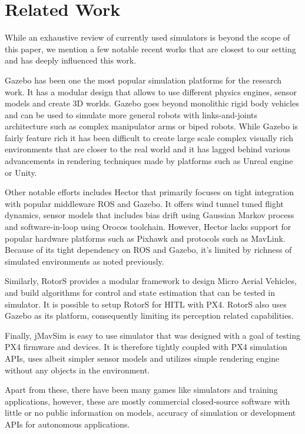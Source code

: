 \documentclass[graybox]{svmult}
\begin{document}
\section{Related Work}
While an exhaustive review of currently used simulators is beyond the scope of this paper, we mention a few notable recent works that are closest to our setting and has deeply influenced this work.

Gazebo \cite{koenig2004design} has been one the most popular simulation platforms for the research work. It has a modular design that allows to use different physics engines, sensor models and create 3D worlds. Gazebo goes beyond monolithic rigid body vehicles and can be used to simulate more general robots with links-and-joints architecture such as complex manipulator arms or biped robots. While Gazebo is fairly feature rich it has been difficult to create large scale complex visually rich environments that are closer to the real world and it has lagged behind various advancements in rendering techniques made by platforms such as Unreal engine or Unity.

Other notable efforts includes Hector \cite{meyer2012comprehensive} that primarily focuses on tight integration with popular middleware ROS and Gazebo. It offers wind tunnel tuned flight dynamics, sensor models that includes bias drift using Gaussian Markov process and software-in-loop using Orocos toolchain. However, Hector lacks support for popular hardware platforms such as Pixhawk and protocols such as MavLink. Because of its tight dependency on ROS and Gazebo, it's limited by richness of simulated environments as noted previously.

Similarly, RotorS \cite{furrer2016rotors} provides a modular framework to design Micro Aerial Vehicles, and build algorithms for control and state estimation that can be tested in simulator. It is possible to setup RotorS for HITL with PX4. RotorS also uses Gazebo as its platform, consequently limiting its perception related capabilities.

Finally, jMavSim \cite{jmavsim} is easy to use simulator that was designed with a goal of testing PX4 firmware and devices. It is therefore tightly coupled with PX4 simulation APIs, uses albeit simpler sensor models and utilizes simple rendering engine without any objects in the environment.

Apart from these, there have been many games like simulators and training applications, however, these are mostly commercial closed-source software with little or no public information on models, accuracy of simulation or development APIs for autonomous applications.
\end{document}
